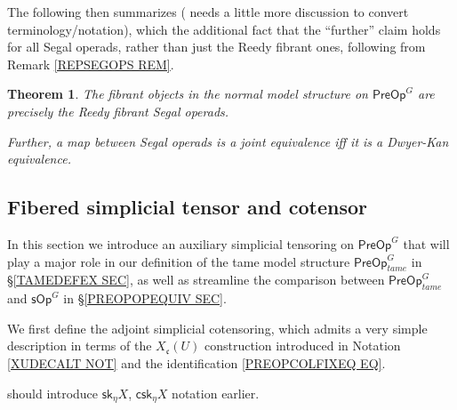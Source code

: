 \documentclass[a4paper,10pt
,draft
]{article}%
\numberwithin{equation}{section}
\numberwithin{figure}{section}
\newtheorem{theorem}[equation]{Theorem}%
\theoremstyle{definition} %
\newcommand{\1}{\ensuremath{\mathbbm 1}}%
\begin{document}
The following then summarizes 
\cite[Thms. 5.51 and 5.48]{BP_edss}
({\color{blue} needs a little more discussion to convert terminology/notation}),
which the additional fact that the ``further'' claim
holds for all Segal operads, rather than just the Reedy fibrant ones, 
following from Remark \ref{REPSEGOPS REM}.


\begin{theorem}\label{FIBPREOP THM}
	The fibrant objects in the normal model structure on 
	$\mathsf{PreOp}^G$
	are precisely the Reedy fibrant Segal operads.
	
	Further, a map between Segal operads is a joint equivalence iff it is a Dwyer-Kan equivalence.
\end{theorem}







\subsection{Fibered simplicial tensor and cotensor}
\label{FIBTENS_SEC}


In this section we introduce an auxiliary 
simplicial tensoring on
$\mathsf{PreOp}^G$
that will play a major role in our definition of the tame model structure 
$\mathsf{PreOp}^G_{tame}$ in \S \ref{TAMEDEFEX SEC},
as well as streamline the comparison 
between
$\mathsf{PreOp}^G_{tame}$
and 
$\mathsf{sOp}^G$ in \S \ref{PREOPOPEQUIV SEC}.

We first define the adjoint simplicial cotensoring,
which admits a very simple description in terms
of the $X_{\mathfrak{c}}(U)$ construction introduced in
Notation \ref{XUDECALT NOT}
and the identification 
\eqref{PREOPCOLFIXEQ EQ}.

{\color{blue} should introduce $\mathsf{sk}_\eta X$, $\mathsf{csk}_\eta X$ notation earlier}.
\end{document}
